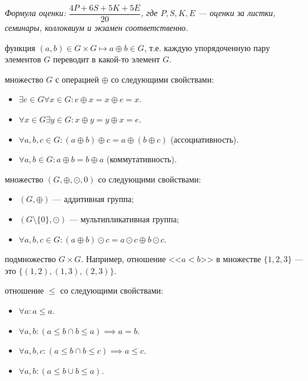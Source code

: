 \documentclass[12pt,a4paper]{article}
\begin{document}

\textit{Формула оценки: $\dfrac{4P+6S+5K+5E}{20}$, где $P,S,K,E$ --- оценки за листки, семинары, коллоквиум и экзамен соответственно.}\\


 функция $(a,b)\in G\times G\mapsto a\oplus b\in G$, т.е. каждую упорядоченную пару элементов $G$ переводит в какой-то элемент $G$.

 множество $G$ с операцией $\oplus$ со следующими свойствами:

\begin{itemize}
	\item $\exists e\in G\forall x\in G: e\oplus x=x\oplus e=x$.
	\item $\forall x\in G\exists y\in G: x\oplus y=y\oplus x=e$.
	\item $\forall a,b,c\in G: (a\oplus b)\oplus c=a\oplus (b\oplus c)$ (ассоциативность).
	\item $\forall a,b\in G: a\oplus b=b\oplus a$ (коммутативность).
\end{itemize}

 множество $(G,\oplus,\odot,0)$ со следующими свойствами:

\begin{itemize}
	\item $(G,\oplus)$ --- аддитивная группа;
	\item $(G\setminus\{0\},\odot)$ --- мультипликативная группа;
	\item $\forall a,b,c\in G: (a\oplus b)\odot c=a\odot c\oplus b\odot c$.
\end{itemize}

 подмножество $G\times G$. Например, отношение <<$a<b$>> в множестве $\{1,2,3\}$ --- это $\{(1,2),(1,3),(2,3)\}$.

 отношение $\leqslant$ со следующими свойствами:

\begin{itemize}
	\item $\forall a:a\leqslant a$.
	\item $\forall a,b:(a\leqslant b\cap b\leqslant a)\implies a=b$.
	\item $\forall a,b,c:(a\leqslant b\cap b\leqslant c)\implies a\leqslant c$.
	\item $\forall a,b:(a\leqslant b\cup b\leqslant a)$.
\end{itemize}
\end{document}

